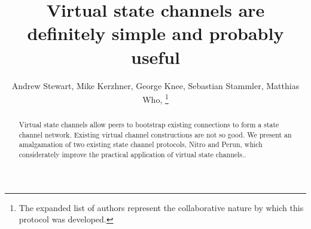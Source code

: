 \documentclass{article}
\title{Virtual state channels are definitely simple and probably useful}
\author{Andrew Stewart, Mike Kerzhner, George Knee, Sebastian Stammler, Matthias Who, \footnote{The expanded list of authors represent the collaborative nature by which this protocol was developed.}}
\begin{document}
\maketitle
\begin{abstract}
  Virtual state channels allow peers to bootstrap existing connections to form a state channel network. Existing virtual channel constructions are not so good. We present an amalgamation of two existing state channel protocols, Nitro and Perun, which considerately improve the practical application of virtual state channels..
\end{abstract} 









\end{document}
